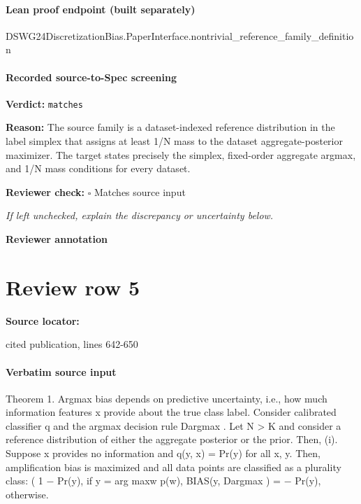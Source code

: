 \documentclass[10pt]{article}
\newcommand{\reviewerbox}{%
  \par\noindent\fbox{\parbox{0.96\linewidth}{\rule{0pt}{0.38in}}}\par
}
\newcommand{\reviewmatch}[1]{%
  \par\noindent\textbf{Reviewer check:} $\square$\; #1\par
  \noindent\emph{If left unchecked, explain the discrepancy or uncertainty below.}\par
}
\begin{document}
\paragraph{Lean proof endpoint (built separately)}\begin{ReviewVerbatim}
DSWG24DiscretizationBias.PaperInterface.nontrivial_reference_family_definition
\end{ReviewVerbatim}

\paragraph{Recorded source-to-Spec screening}
\textbf{Verdict:} \texttt{matches}
\\
{\raggedright
\textbf{Reason:} The source family is a dataset-\allowbreak{}indexed reference distribution in the label simplex that assigns at least 1/\allowbreak{}N mass to the dataset aggregate-\allowbreak{}posterior maximizer.\allowbreak{} The target states precisely the simplex, fixed-\allowbreak{}order aggregate argmax, and 1/\allowbreak{}N mass conditions for every dataset.\allowbreak{}
\par}
\reviewmatch{Matches source input}
\noindent\textbf{Reviewer annotation}\par
\reviewerbox
\clearpage
\hypertarget{source-claim-861b407dcf52f582}{}
\section*{Review row 5}
\textbf{Source locator:} {\footnotesize\raggedright cited publication, lines 642-\allowbreak{}650\par}
\paragraph{Verbatim source input}
\begin{ReviewVerbatim}
Theorem 1. Argmax bias depends on predictive uncertainty, i.e., how much information features x provide
about the true class label. Consider calibrated classifier q and the argmax decision rule Dargmax . Let N > K
and consider a reference distribution of either the aggregate posterior or the prior. Then,
  (i). Suppose x provides no information and q(y, x) = Pr(y) for all x, y. Then, amplification bias is
       maximized and all data points are classified as a plurality class:
                                                  (
                                                    1 − Pr(y), if y = arg maxw p(w),
                            BIAS(y, Dargmax ) =
                                                    − Pr(y),      otherwise.
\end{ReviewVerbatim}
\end{document}
